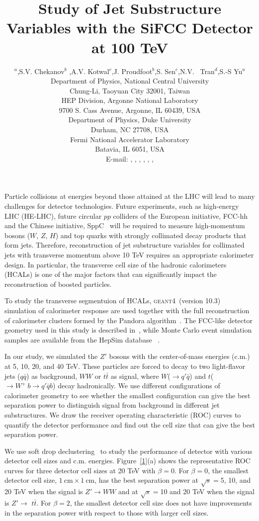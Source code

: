 \documentclass[a4paper]{PoS}
\title{Study of Jet Substructure Variables with the SiFCC Detector at 100 TeV}
\author{\speaker{C.-H Yeh}$^a$,S.V. Chekanov$^b$ ,A.V. Kotwal$^{c}$,J. Proudfoot$^{b}$,S. Sen$^{c}$,N.V. ~Tran$^{d}$,S.-S Yu$^{a}$\\     
     \llap{$^a$}Department of Physics, National Central University\\
     Chung-Li, Taoyuan City 32001, Taiwan\\
     \llap{$^b$}HEP Division, Argonne National Laboratory\\
     9700 S. Cass Avenue, Argonne, IL 60439, USA\\
     \llap{$^c$}Department of Physics, Duke University\\
     Durham, NC 27708, USA\\
     \llap{$^d$}Fermi National Accelerator Laboratory\\
     Batavia, IL 6051, USA\\
     E-mail:  \email{a9510130375@gmail.com},
     \email{chekanov@anl.gov},
     \email{kotwal@phy.duke.edu},
     \email{sourav.sen@duke.edu},
     \email{ntran@fnal.gov},
     \email{proudfoot@anl.gov},
     \email{syu@phy.ncu.edu.tw}}
\newcommand{\GEANTfour} {\textsc{geant4}}
\begin{document}
Particle collisions at energies  beyond those attained at the LHC will lead to many 
challenges for detector technologies.
Future experiments, such as high-energy LHC (HE-LHC),
future circular $pp$ colliders of the European initiative, FCC-hh~\cite{Benedikt:2206376} and the Chinese initiative, SppC~\cite{Tang:2015qga} will be required to measure high-momentum bosons ($W$, $Z$, $H$) and top quarks with strongly
collimated decay products that form jets.  
Therefore, reconstruction of jet substructure  variables for collimated jets with transverse 
momentum above 10 TeV
requires an appropriate calorimeter design.  In particular, the transverse cell size of the hadronic 
calorimeters  (HCALs) is one of the major factors that can significantly impact 
the reconstruction of boosted particles.

To study the transverse segmentuion of HCALs,
\GEANTfour\ (version 10.3) ~\cite{Allison:2016} simulation of calorimeter response are used together
with the full reconstruction of calorimeter clusters formed by the Pandora algorithm~\cite{Marshall:2013,Charles:2009ta}.
The FCC-like detector geometry used in this study is described in~\cite{Chekanov:2016ppq},
while Monte Carlo event simulation samples are available from the
HepSim database ~\cite{Chekanov:2014fga}.

In our study, we simulated the $Z'$ bosons with the center-of-mass energies (c.m.) at 5, 10, 20, and 40 TeV. These particles are forced to decay to two light-flavor jets ($q\bar{q}$) as background, $W W$ or $t\bar{t}$ as signal, where $W$($\rightarrow$$q'\bar{q}$) and $t$($ \rightarrow  W^+\>b \rightarrow q'\bar{q} b$) decay hadronically. We use different configurations of calorimeter geometry to see whether the smallest configuration can give the best separation power to distinguish signal from background in different jet substructures. We draw the receiver operating characteristic (ROC) curves to quantify the detector performance and find out the cell size that can give the best separation power.

We use soft drop declustering~\cite{Larkoski:2014wba} to study the performance of detector with various detector cell sizes and c.m. energies. Figure~\ref{1}(a) shows the representative ROC curves for three detector cell sizes at 20 TeV with $\beta=0$. For $\beta=0$, the smallest detector cell size, $1~\mathrm{cm}\times1~\mathrm{cm}$, has the best separation power at $\sqrt{s}=$5, 10, and 20 TeV when the signal is $Z' \rightarrow WW$ and at $\sqrt{s}=$10 and 20 TeV when the signal is $Z' \rightarrow$ $t\bar{t}$. For $\beta=2$, the smallest detector cell size does not have improvements in the separation power with respect to those with larger cell sizes.
\end{document}

